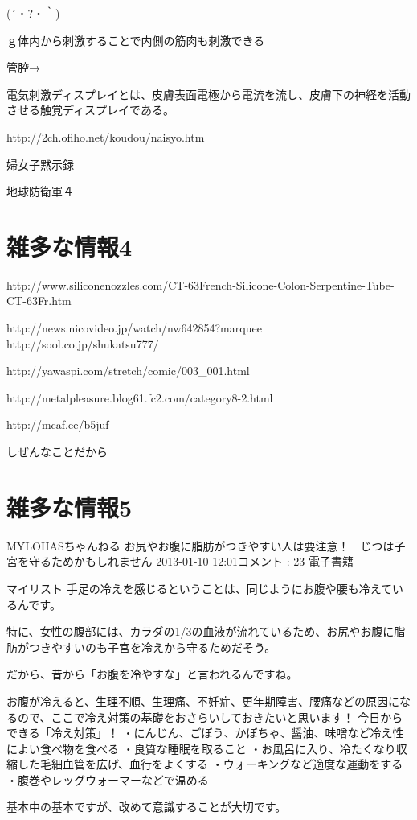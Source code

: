 (´・?・｀)


ｇ体内から刺激することで内側の筋肉も刺激できる


管腔→

電気刺激ディスプレイとは、皮膚表面電極から電流を流し、皮膚下の神経を活動させる触覚ディスプレイである。


http://2ch.ofiho.net/koudou/naisyo.htm


婦女子黙示録

地球防衛軍４

\section{雑多な情報4}
http://www.siliconenozzles.com/CT-63French-Silicone-Colon-Serpentine-Tube-CT-63Fr.htm

http://news.nicovideo.jp/watch/nw642854?marquee
http://sool.co.jp/shukatsu777/%


http://yawaspi.com/stretch/comic/003_001.html

http://metalpleasure.blog61.fc2.com/category8-2.html

http://mcaf.ee/b5juf

しぜんなことだから

\section{雑多な情報5}


MYLOHASちゃんねる
お尻やお腹に脂肪がつきやすい人は要注意！　じつは子宮を守るためかもしれません
2013-01-10 12:01コメント : 23 
電子書籍
    
マイリスト  
手足の冷えを感じるということは、同じようにお腹や腰も冷えているんです。

特に、女性の腹部には、カラダの1/3の血液が流れているため、お尻やお腹に脂肪がつきやすいのも子宮を冷えから守るためだそう。

だから、昔から「お腹を冷やすな」と言われるんですね。

お腹が冷えると、生理不順、生理痛、不妊症、更年期障害、腰痛などの原因になるので、ここで冷え対策の基礎をおさらいしておきたいと思います！
今日からできる「冷え対策」！
・にんじん、ごぼう、かぼちゃ、醤油、味噌など冷え性によい食べ物を食べる
・良質な睡眠を取ること
・お風呂に入り、冷たくなり収縮した毛細血管を広げ、血行をよくする
・ウォーキングなど適度な運動をする
・腹巻やレッグウォーマーなどで温める

基本中の基本ですが、改めて意識することが大切です。

